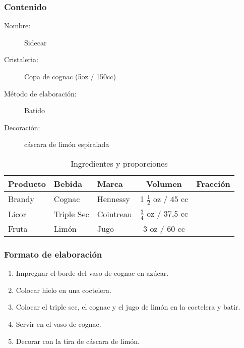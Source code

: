 \bigskip 
\bigskip 
\subsubsection{Contenido}
\bigskip 

\begin{description}
\item[Nombre:] Sidecar
\item[Cristaleria:] Copa de cognac (5oz / 150cc)
\item[M\'etodo de elaboraci\'on:] Batido
\item[Decoraci\'on:] c\'ascara de lim\'on espiralada
\end{description}

\begin{table}[h]
\caption{Ingredientes y proporciones} 
\label{tab:fonts}
\begin{center}       
\begin{tabular}{|l|l|l|c|l|} %
\hline
\rule[-1ex]{0pt}{3.5ex}  \textbf{Producto} & \textbf{Bebida} & \textbf{Marca} & \textbf{Volumen} & \textbf{Fracci\'on}  \\
\hline
\rule[-1ex]{0pt}{3.5ex}  Brandy		& Cognac			& Hennessy		 		& 1  $\frac{1}{2}$ oz / 45 cc 	&  	\\
\hline
\rule[-1ex]{0pt}{3.5ex}  Licor 		& Triple Sec 	& Cointreau 				& $\frac{3}{4}$ oz / 37,5 cc 		&  	\\
\hline
\rule[-1ex]{0pt}{3.5ex}  Fruta 		& Lim\'on	 	& Jugo	 				& 3 oz / 60 cc					& 	\\
\hline
\end{tabular}
\end{center}
\end{table} 
\bigskip 

\subsubsection{Formato de elaboraci\'on} 
\label{sec:title}
\bigskip 
\begin{center}
\begin{enumerate}
\item Impregnar el borde del vaso de cognac en az\'ucar.
\item Colocar hielo en una coctelera.
\item Colocar el triple sec, el cognac y el jugo de lim\'on en la coctelera y batir.
\item Servir en el vaso de cognac.
\item Decorar con la tira de c\'ascara de lim\'on.
\end{enumerate}
\end{center}
\bigskip 
\bigskip 

